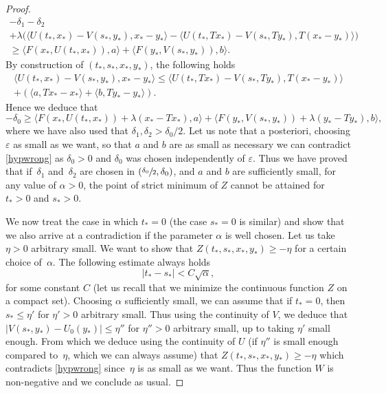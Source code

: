 \documentclass[10pt]{amsart}
\let\epsilon\varepsilon
\theoremstyle{definition}
\begin{document}
\begin{proof}
\begin{multline}
- \delta_1 - \delta_2\\
+\lambda \bigl(\langle U(t_*,x_*)-V(s_*,y_*), x_* -y_*\rangle-\langle U(t_*,Tx_*)-V(s_*,Ty_*), T(x_*-y_*)\rangle\bigr) \\
\geq  \langle F(x_*,U(t_*,x_*)),a\rangle+\langle F(y_*,V(s_*,y_*)),b\rangle.
\end{multline}
By construction of $(t_*,s_*,x_*,y_*)$, the following holds
\begin{multline*}
\langle U(t_*,x_*)-V(s_*,y_*), x_* -y_*\rangle \leq \langle U(t_*,Tx_*)-V(s_*,Ty_*), T(x_*-y_*)\rangle \\
+ (\langle a, Tx_* -x_*\rangle+\langle b, Ty_* -y_*\rangle).
\end{multline*}
Hence we deduce that
\begin{equation*}
-\delta_0 \geq \langle F(x_*,U(t_*,x_*))+\lambda(x_*-Tx_*),a\rangle+\langle F(y_*,V(s_*,y_*))+\lambda(y_*-Ty_*),b\rangle,
\end{equation*}
where we have also used that $\delta_1,\delta_2 > \delta_0/2$. Let us note that a posteriori, choosing $\epsilon$ as small as we want, so that $a$ and $b$ are as small as necessary we can contradict \eqref{hypwrong} as $\delta_0 > 0$ and $\delta_0$ was chosen independently of $\epsilon$. Thus we have proved that if~$\delta_1$ and~$\delta_2$ are chosen in $(\sfrac{\delta_0}{2}, \delta_0)$, and $a$ and $b$ are sufficiently small, for any value of $\alpha > 0$, the point of strict minimum of $Z$ cannot be attained for $t_* > 0$ and $s_* > 0$.

We now treat the case in which $t_* = 0$ (the case $s_* = 0$ is similar) and show that we also arrive at a contradiction if the parameter $\alpha$ is well chosen. Let us take $\eta > 0$ arbitrary small. We want to show that $Z(t_*,s_*,x_*,y_*) \geq-\eta$ for a certain choice of~$\alpha$. The following estimate always holds
\begin{equation*}
|t_*-s_*|< C \sqrt{\alpha},
\end{equation*}
for some constant $C$ (let us recall that we minimize the continuous function $Z$ on a compact set). Choosing $\alpha$ sufficiently small, we can assume that if $t_* = 0$, then $s_* \leq \eta'$ for $\eta'>0$ arbitrary small. Thus using the continuity of $V$, we deduce that $|V(s_*,y_*)-U_0(y_*)|\leq \eta''$ for $\eta''>0$ arbitrary small, up to taking $\eta'$ small enough. From which we deduce using the continuity of $U$ (if $\eta''$ is small enough compared to~$\eta$, which we can always assume) that $Z(t_*,s_*,x_*,y_*) \geq-\eta$ which contradicts \eqref{hypwrong} since~$\eta$ is as small as we want. Thus the function $W$ is non-negative and we conclude as usual.
\end{proof}
\end{document}
